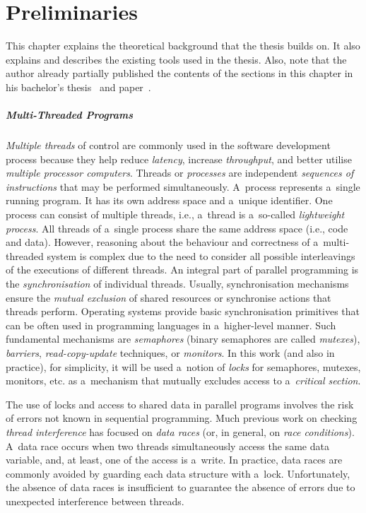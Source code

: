 


\chapter{Preliminaries}
\label{chap:prelim}

This chapter explains the theoretical background that the thesis builds on. It also explains and describes the existing tools used in the thesis. Also, note that the author already partially published the contents of the sections in this chapter in his bachelor's thesis~\cite{harmimBP} and paper~\cite{excel2021Harmim}.

\paragraph{Multi-Threaded Programs~\cite{atomizer, muzikovskaBP}}
\emph{Multiple threads} of control are commonly used in the software development process because they help reduce \emph{latency}, increase \emph{throughput}, and better utilise \emph{multiple processor computers}. Threads or \emph{processes} are independent \emph{sequences of instructions} that may be performed simultaneously. A~process represents a~single running program. It has its own address space and a~unique identifier. One process can consist of multiple threads, i.e., a~thread is a~so-called \emph{lightweight process}. All threads of a~single process share the same address space (i.e., code and data). However, reasoning about the behaviour and correctness of a~multi-threaded system is complex due to the need to consider all possible interleavings of the executions of different threads. An integral part of parallel programming is the \emph{synchronisation} of individual threads. Usually, synchronisation mechanisms ensure the \emph{mutual exclusion} of shared resources or synchronise actions that threads perform. Operating systems provide basic synchronisation primitives that can be often used in programming languages in a~higher-level manner. Such fundamental mechanisms are \emph{semaphores} (binary semaphores are called \emph{mutexes}), \emph{barriers}, \emph{read-copy-update} techniques, or \emph{monitors}. In this work (and also in practice), for simplicity, it will be used a~notion of \emph{locks} for semaphores, mutexes, monitors, etc. as a~mechanism that mutually excludes access to a~\emph{critical section}.

The use of locks and access to shared data in parallel programs involves the risk of errors not known in sequential programming. Much previous work on checking \emph{thread interference} has focused on \emph{data races} (or, in general, on \emph{race conditions}). A~data race occurs when two threads simultaneously access the same data variable, and, at least, one of the access is a~write. In practice, data races are commonly avoided by guarding each data structure with a~lock. Unfortunately, the absence of data races is insufficient to guarantee the absence of errors due to unexpected interference between threads.~\cite{atomizer, atomicityOOP}

